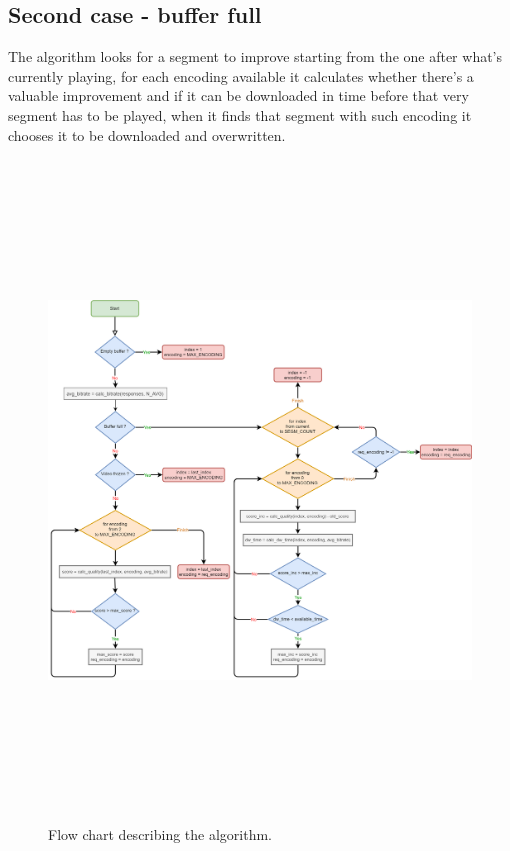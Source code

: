 \documentclass[10pt, a4paper]{article}
\begin{document}
\begin{multicols}{2}
        \subsection{Second case - buffer full}
        The algorithm looks for a segment to improve starting from the
        one after what's currently playing, for each encoding available it calculates whether there's
        a valuable improvement and if it can be downloaded in time before that very segment
        has to be played, when it finds that segment with such encoding it chooses it to be 
        downloaded and overwritten.
    \end{multicols}

    \begin{figure}[h]
        \includegraphics[width=\textwidth, height=17.5cm]{Policy_flowchart_2}
        \caption{Flow chart describing the algorithm.}
    \end{figure}
\end{document}
